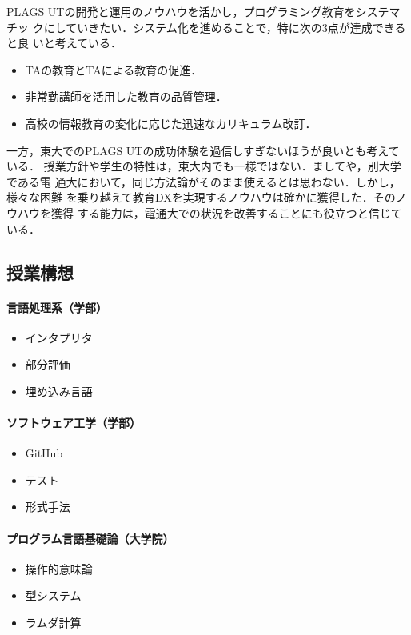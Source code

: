 \documentclass[dvipdfmx]{jsarticle}
\begin{document}
PLAGS UTの開発と運用のノウハウを活かし，プログラミング教育をシステマチッ
クにしていきたい．システム化を進めることで，特に次の3点が達成できると良
いと考えている．
\begin{itemize}
 \item TAの教育とTAによる教育の促進．

 \item 非常勤講師を活用した教育の品質管理．

 \item 高校の情報教育の変化に応じた迅速なカリキュラム改訂．
\end{itemize}

一方，東大でのPLAGS UTの成功体験を過信しすぎないほうが良いとも考えている．
授業方針や学生の特性は，東大内でも一様ではない．ましてや，別大学である電
通大において，同じ方法論がそのまま使えるとは思わない．しかし，様々な困難
を乗り越えて教育DXを実現するノウハウは確かに獲得した．そのノウハウを獲得
する能力は，電通大での状況を改善することにも役立つと信じている．

\subsection*{授業構想}

\paragraph{言語処理系（学部）}
\begin{itemize}
 \item インタプリタ
 \item 部分評価
 \item 埋め込み言語
\end{itemize}

\paragraph{ソフトウェア工学（学部）}
\begin{itemize}
 \item GitHub
 \item テスト
 \item 形式手法
\end{itemize}

\paragraph{プログラム言語基礎論（大学院）}
\begin{itemize}
 \item 操作的意味論
 \item 型システム
 \item ラムダ計算
\end{itemize}
\end{document}
